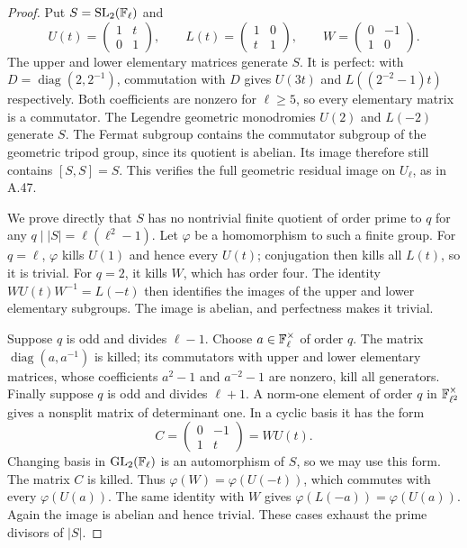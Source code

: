 \begin{proof}
Put $S=\mathrm{SL}_2(\mathbb F_\ell)$ and
\[
 U(t)=\begin{pmatrix}1&t\\0&1\end{pmatrix},\qquad
 L(t)=\begin{pmatrix}1&0\\t&1\end{pmatrix},\qquad
 W=\begin{pmatrix}0&-1\\1&0\end{pmatrix}.
\]
The upper and lower elementary matrices generate $S$. It is perfect:
with $D=\operatorname{diag}(2,2^{-1})$, commutation with $D$ gives
$U(3t)$ and $L((2^{-2}-1)t)$ respectively. Both coefficients are
nonzero for $\ell\ge5$, so every elementary matrix is a commutator.
The Legendre geometric monodromies $U(2)$ and $L(-2)$ generate $S$.
The Fermat subgroup contains the commutator subgroup of the geometric
tripod group, since its quotient is abelian. Its image therefore still
contains $[S,S]=S$. This verifies the full geometric residual image
on $U_\ell$, as in A.47.

We prove directly that $S$ has no nontrivial finite quotient of order
prime to $q$ for any $q\mid|S|=\ell(\ell^2-1)$. Let $\varphi$ be
a homomorphism to such a finite group.
For $q=\ell$, $\varphi$ kills $U(1)$ and hence every $U(t)$;
conjugation then kills all $L(t)$, so it is trivial.
For $q=2$, it kills $W$, which has order four. The identity
$WU(t)W^{-1}=L(-t)$ then identifies the images of the upper and lower
elementary subgroups. The image is abelian, and perfectness makes it
trivial.

Suppose $q$ is odd and divides $\ell-1$. Choose $a\in\mathbb F_\ell^\times$
of order $q$. The matrix $\operatorname{diag}(a,a^{-1})$ is killed;
its commutators with upper and lower elementary matrices, whose
coefficients $a^2-1$ and $a^{-2}-1$ are nonzero, kill all generators.
Finally suppose $q$ is odd and divides $\ell+1$. A norm-one element
of order $q$ in $\mathbb F_{\ell^2}^\times$ gives a nonsplit matrix of
determinant one. In a cyclic basis it has the form
\[
 C=\begin{pmatrix}0&-1\\1&t\end{pmatrix}=WU(t).
\]
Changing basis in $\mathrm{GL}_2(\mathbb F_\ell)$ is an automorphism of $S$,
so we may use this form. The matrix $C$ is killed. Thus
$\varphi(W)=\varphi(U(-t))$, which commutes with every
$\varphi(U(a))$. The same identity with $W$ gives
$\varphi(L(-a))=\varphi(U(a))$. Again the image is abelian and hence
trivial. These cases exhaust the prime divisors of $|S|$.


\end{proof}
